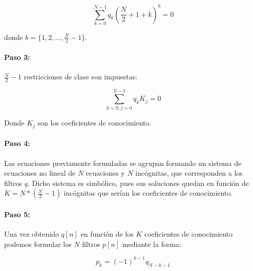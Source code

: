 \documentclass[11pt]{article}
\begin{document}
\begin{equation}
    \sum_{k=0}^{N - 1} q_{k}(\frac{N}{2} + 1 + k)^b = 0
\end{equation}

donde \(b = \{1, 2, ..., \frac{N}{2} - 1\}\).

\paragraph*{Paso 3:}
\(\frac{N}{2} - 1\) restricciones de clase son impuestas:

\begin{equation}
    \sum_{k=0, j=0}^{N - 1} q_{k}K_{j} = 0
\end{equation}

Donde \(K_{j}\) son los coeficientes de conocimiento.

\paragraph*{Paso 4:}
Las ecuaciones previamente formuladas se agrupan formando un sistema de ecuaciones no lineal de \(N\) ecuaciones y \(N\) incógnitas, que corresponden a 
los filtros \(q\). Dicho sistema es simbólico, pues sus soluciones quedan en función de \(K = N * (\frac{N}{2} - 1)\) 
incógnitas que serían los coeficientes de conocimiento.

\paragraph*{Paso 5:}
Una vez obtenido \(q[n]\) en función de los \(K\) coeficientes de conocimiento podemos formular 
los \(N\) filtros \(p[n]\) mediante la forma:

\begin{equation}
    p_{k} = (-1)^{k-1}q_{N - k - 1}
\end{equation}

\end{document}
